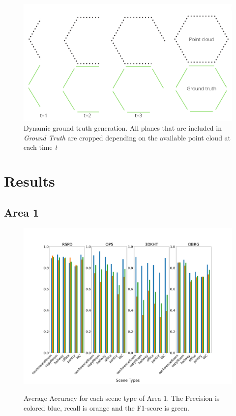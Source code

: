 \documentclass[main.tex]{subfiles}
\begin{document}
\begin{figure}[H]
    \centering
    \includegraphics[width=15 cm]{images/dynamic_eval.png}
    \caption[Dynamic Ground Truth Generation]{Dynamic ground truth generation. All planes that are included in \textit{Ground Truth} are cropped depending on
        the available point cloud at each time \textit{t} }
    \label{fig:dynGT}
\end{figure}


\section{Results}

\subsection{Area 1}
\begin{figure}[H]
    \centering
    \includegraphics[width=15 cm]{images/area_1_acc.png}
    \label{fig:area1A}
    \caption[Accuracies Area 1]{Average Accuracy for each scene type of Area 1. The Precision
        is colored blue, recall is orange and the F1-score is green. }
\end{figure}
\end{document}

